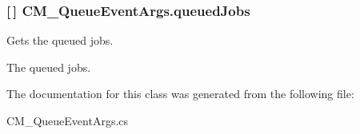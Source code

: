 \subsubsection[{queued\+Jobs}]{ \mbox{[}$\,$\mbox{]} C\+M\+\_\+\+Queue\+Event\+Args.\+queued\+Jobs\hspace{0.3cm}{\ttfamily [get]}}\label{class_c_m___queue_event_args_a9a7016a83b4d77bfede3932565c13704}


Gets the queued jobs. 

The queued jobs.

The documentation for this class was generated from the following file\+:\begin{DoxyCompactItemize}
\item 
C\+M\+\_\+\+Queue\+Event\+Args.\+cs\end{DoxyCompactItemize}

